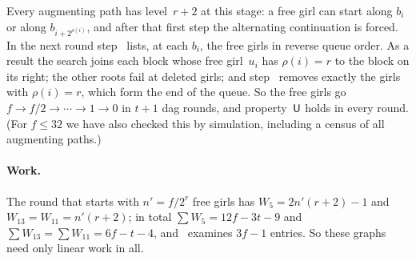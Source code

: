 Every augmenting path has level~$r+2$ at this stage: a free girl can start
along $b_i$ or along $b_{i+2^{\rho(i)}}$, and after that first step the
alternating continuation is forced. In the next round step~ lists, at
each $b_i$, the free girls in reverse queue order. As a result the search
joins each block whose free girl~$u_i$ has $\rho(i)=r$ to the block on its
right; the other roots fail at deleted girls; and step~ removes
exactly the girls with $\rho(i)=r$, which form the end of the queue. So the
free girls go $f\to f/2\to\cdots\to1\to0$ in $t+1$ dag rounds, and
property~$\mathsf U$ holds in every round. (For $f\le32$ we have also checked
this by simulation, including a census of all augmenting paths.)

\paragraph{Work.} The round that starts with $n'=f/2^r$ free girls has
$W_5=2n'(r+2)-1$ and $W_{13}=W_{11}=n'(r+2)$; in total
$\sum W_5=12f-3t-9$ and $\sum W_{13}=\sum W_{11}=6f-t-4$, and~ examines
$3f-1$ entries. So these graphs need only linear work in all.
